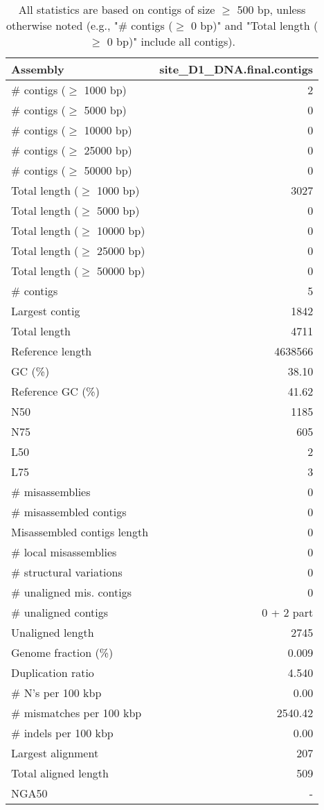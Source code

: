 \documentclass[12pt,a4paper]{article}
\begin{document}
\begin{table}[ht]
\begin{center}
\caption{All statistics are based on contigs of size $\geq$ 500 bp, unless otherwise noted (e.g., "\# contigs ($\geq$ 0 bp)" and "Total length ($\geq$ 0 bp)" include all contigs).}
\begin{tabular}{|l*{1}{|r}|}
\hline
Assembly & site\_D1\_DNA.final.contigs \\ \hline
\# contigs ($\geq$ 1000 bp) & 2 \\ \hline
\# contigs ($\geq$ 5000 bp) & 0 \\ \hline
\# contigs ($\geq$ 10000 bp) & 0 \\ \hline
\# contigs ($\geq$ 25000 bp) & 0 \\ \hline
\# contigs ($\geq$ 50000 bp) & 0 \\ \hline
Total length ($\geq$ 1000 bp) & 3027 \\ \hline
Total length ($\geq$ 5000 bp) & 0 \\ \hline
Total length ($\geq$ 10000 bp) & 0 \\ \hline
Total length ($\geq$ 25000 bp) & 0 \\ \hline
Total length ($\geq$ 50000 bp) & 0 \\ \hline
\# contigs & 5 \\ \hline
Largest contig & 1842 \\ \hline
Total length & 4711 \\ \hline
Reference length & 4638566 \\ \hline
GC (\%) & 38.10 \\ \hline
Reference GC (\%) & 41.62 \\ \hline
N50 & 1185 \\ \hline
N75 & 605 \\ \hline
L50 & 2 \\ \hline
L75 & 3 \\ \hline
\# misassemblies & 0 \\ \hline
\# misassembled contigs & 0 \\ \hline
Misassembled contigs length & 0 \\ \hline
\# local misassemblies & 0 \\ \hline
\# structural variations & 0 \\ \hline
\# unaligned mis. contigs & 0 \\ \hline
\# unaligned contigs & 0 + 2 part \\ \hline
Unaligned length & 2745 \\ \hline
Genome fraction (\%) & 0.009 \\ \hline
Duplication ratio & 4.540 \\ \hline
\# N's per 100 kbp & 0.00 \\ \hline
\# mismatches per 100 kbp & 2540.42 \\ \hline
\# indels per 100 kbp & 0.00 \\ \hline
Largest alignment & 207 \\ \hline
Total aligned length & 509 \\ \hline
NGA50 & - \\ \hline
\end{tabular}
\end{center}
\end{table}
\end{document}
